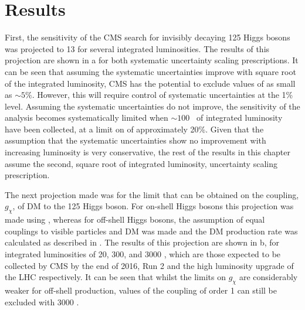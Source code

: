 \section{Results}
\label{sec:dmresults}
First, the sensitivity of the CMS search for invisibly decaying 125 \GeV Higgs bosons was projected to 13 \TeV for several integrated luminosities. The results of this projection are shown in a for both systematic uncertainty scaling prescriptions. It can be seen that assuming the systematic uncertainties improve with square root of the integrated luminosity, CMS has the potential to exclude values of \BRinv as small as $\sim 5\%$. However, this will require control of systematic uncertainties at the 1\% level. Assuming the systematic uncertainties do not improve, the sensitivity of the analysis becomes systematically limited when $\sim 100$ \invfb\, of integrated luminosity have been collected, at  a limit on \BRinv of approximately 20\%. Given that the assumption that the systematic uncertainties show no improvement with increasing luminosity is very conservative, the rest of the results in this chapter assume the second, square root of integrated luminosity, uncertainty scaling prescription.

The next projection made was for the limit that can be obtained on the coupling, $g_{\chi}$, of \ac{DM} to the 125 \GeV Higgs boson. For on-shell Higgs bosons this projection was made using , whereas for off-shell Higgs bosons, the assumption of equal couplings to visible particles and \ac{DM} was made and the \ac{DM} production rate was calculated as described in . The results of this projection are shown in b, for integrated luminosities of 20, 300, and 3000 \invfb, which are those expected to be collected by CMS by the end of 2016, Run 2 and the high luminosity upgrade of the LHC respectively. It can be seen that whilst the limits on $g_{\chi}$ are considerably weaker for off-shell production, values of the coupling of order 1 can still be excluded with 3000 \invfb.

